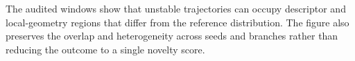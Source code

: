 The audited windows show that unstable trajectories can occupy descriptor and local-geometry regions that differ from the reference distribution. The figure also preserves the overlap and heterogeneity across seeds and branches rather than reducing the outcome to a single novelty score.

